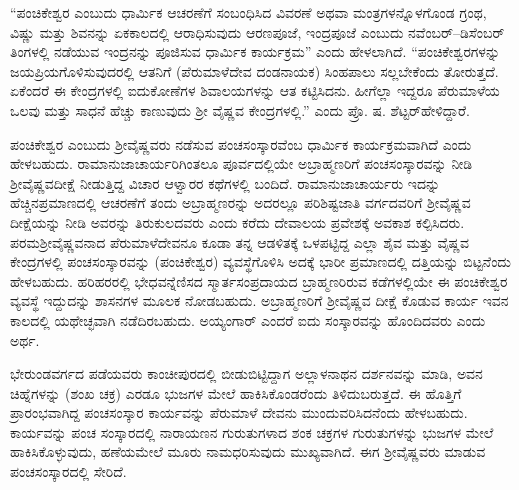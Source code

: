 “ಪಂಚಿಕೇಶ್ವರ ಎಂಬುದು ಧಾರ್ಮಿಕ ಆಚರಣೆಗೆ ಸಂಬಂಧಿಸಿದ ವಿವರಣೆ ಅಥವಾ ಮಂತ್ರಗಳನ್ನೊಳಗೊಂಡ ಗ್ರಂಥ, ವಿಷ್ಣು ಮತ್ತು ಶಿವನನ್ನು ಏಕಕಾಲದಲ್ಲಿ ಆರಾಧಿಸುವುದು ಆರಣಪೂಜೆ, ಇಂದ್ರಪೂಜೆ ಎಂಬುದು ನವೆಂಬರ್​–ಡಿಸೆಂಬರ್​ ತಿಂಗಳಲ್ಲಿ ನಡೆಯುವ ಇಂದ್ರನನ್ನು ಪೂಜಿಸುವ ಧಾರ್ಮಿಕ ಕಾರ್ಯಕ್ರಮ” ಎಂದು ಹೇಳಲಾಗಿದೆ. “ಪಂಚಿಕೇಶ್ವರಗಳನ್ನು ಜಯಪ್ರಿಯಗೊಳಿಸುವುದರಲ್ಲಿ ಆತನಿಗೆ (ಪೆರುಮಾಳೆದೇವ ದಂಡನಾಯಕ) ಸಿಂಹಪಾಲು ಸಲ್ಲಬೇಕೆಂದು ತೋರುತ್ತದೆ. ಏಕೆಂದರೆ ಈ ಕೇಂದ್ರಗಳಲ್ಲಿ ಐದುಕೋಣೆಗಳ ಶಿವಾಲಯಗಳನ್ನು ಆತ ಕಟ್ಟಿಸಿದನು. ಹೀಗೆಲ್ಲಾ ಇದ್ದರೂ ಪೆರುಮಾಳೆಯ ಒಲವು ಮತ್ತು ಸಾಧನೆ ಹೆಚ್ಚು ಕಾಣುವುದು ಶ‍್ರೀ ವೈಷ್ಣವ ಕೇಂದ್ರಗಳಲ್ಲಿ.” ಎಂದು ಪ್ರೊ. ಷ. ಶೆಟ್ಟರ್​ ಹೇಳಿದ್ದಾರೆ.

ಪಂಚಿಕೇಶ್ವರ ಎಂಬುದು ಶ‍್ರೀವೈಷ್ಣವರು ನಡೆಸುವ ಪಂಚಸಂಸ್ಕಾರವೆಂಬ ಧಾರ್ಮಿಕ ಕಾರ್ಯಕ್ರಮವಾಗಿದೆ ಎಂದು ಹೇಳಬಹುದು. ರಾಮಾನುಜಾಚಾರ್ಯರಿಗಿಂತಲೂ ಪೂರ್ವದಲ್ಲಿಯೇ ಅಬ್ರಾಹ್ಮಣರಿಗೆ ಪಂಚಸಂಸ್ಕಾರವನ್ನು ನೀಡಿ ಶ‍್ರೀವೈಷ್ಣವದೀಕ್ಷೆ ನೀಡುತ್ತಿದ್ದ ವಿಚಾರ ಆಳ್ವಾರರ ಕಥೆಗಳಲ್ಲಿ ಬಂದಿದೆ. ರಾಮಾನುಜಾಚಾರ್ಯರು ಇದನ್ನು ಹೆಚ್ಚಿನಪ್ರಮಾಣದಲ್ಲಿ ಆಚರಣೆಗೆ ತಂದು ಅಬ್ರಾಹ್ಮಣರನ್ನು ಅದರಲ್ಲೂ ಪರಿಶಿಷ್ಟಜಾತಿ ವರ್ಗದವರಿಗೆ ಶ‍್ರೀವೈಷ್ಣವ ದೀಕ್ಷೆಯನ್ನು ನೀಡಿ ಅವರನ್ನು ತಿರುಕುಲದವರು ಎಂದು ಕರೆದು ದೇವಾಲಯ ಪ್ರವೇಶಕ್ಕೆ ಅವಕಾಶ ಕಲ್ಪಿಸಿದರು. ಪರಮಶ‍್ರೀವೈಷ್ಣವನಾದ ಪೆರುಮಾಳೆದೇವನೂ ಕೂಡಾ ತನ್ನ ಆಡಳಿತಕ್ಕೆ ಒಳಪಟ್ಟಿದ್ದ ಎಲ್ಲಾ ಶೈವ ಮತ್ತು ವೈಷ್ಣವ ಕೇಂದ್ರಗಳಲ್ಲಿ ಪಂಚಸಂಸ್ಕಾರವನ್ನು (ಪಂಚಿಕೇಶ್ವರ) ವ್ಯವಸ್ಥೆಗೊಳಿಸಿ ಅದಕ್ಕೆ ಭಾರೀ ಪ್ರಮಾಣದಲ್ಲಿ ದತ್ತಿಯನ್ನು ಬಿಟ್ಟನೆಂದು ಹೇಳಬಹುದು. ಹರಿಹರರಲ್ಲಿ ಭೇಧವನ್ನೆಣಿಸದ ಸ್ಮಾರ್ತಸಂಪ್ರದಾಯದ ಬ್ರಾಹ್ಮಣರಿರುವ ಕಡೆಗಳಲ್ಲಿಯೇ ಈ ಪಂಚಿಕೇಶ್ವರ ವ್ಯವಸ್ಥೆ ಇದ್ದುದನ್ನು ಶಾಸನಗಳ ಮೂಲಕ ನೋಡಬಹುದು. ಅಬ್ರಾಹ್ಮಣರಿಗೆ ಶ‍್ರೀವೈಷ್ಣವ ದೀಕ್ಷೆ ಕೊಡುವ ಕಾರ್ಯ ಇವನ ಕಾಲದಲ್ಲಿ ಯಥೇಚ್ಛವಾಗಿ ನಡೆದಿರಬಹುದು. ಅಯ್ಯಂಗಾರ್​ ಎಂದರೆ ಐದು ಸಂಸ್ಕಾರವನ್ನು ಹೊಂದಿದವರು ಎಂದು ಅರ್ಥ.

ಭೇರುಂಡವರ್ಗದ ಪಡೆಯವರು ಕಾಂಚೀಪುರದಲ್ಲಿ ಬೀಡುಬಿಟ್ಟಿದ್ದಾಗ ಅಲ್ಲಾಳನಾಥನ ದರ್ಶನವನ್ನು ಮಾಡಿ, ಅವನ ಚಿಹ್ನೆಗಳನ್ನು (ಶಂಖ ಚಕ್ರ) ಎರಡೂ ಭುಜಗಳ ಮೇಲೆ ಹಾಕಿಸಿಕೊಂಡರೆಂದು ತಿಳಿದುಬರುತ್ತದೆ. ಈ ಹೊತ್ತಿಗೆ ಪ್ರಾರಂಭವಾಗಿದ್ದ ಪಂಚಸಂಸ್ಕಾರ ಕಾರ್ಯವನ್ನು ಪೆರುಮಾಳೆ ದೇವನು ಮುಂದುವರಿಸಿದನೆಂದು ಹೇಳಬಹುದು. ಕಾರ್ಯವನ್ನು ಪಂಚ ಸಂಸ್ಕಾರದಲ್ಲಿ ನಾರಾಯಣನ ಗುರುತುಗಳಾದ ಶಂಕ ಚಕ್ರಗಳ ಗುರುತುಗಳನ್ನು ಭುಜಗಳ ಮೇಲೆ ಹಾಕಿಸಿಕೊಳ್ಳುವುದು, ಹಣೆಯಮೇಲೆ ಮೂರು ನಾಮಧರಿಸುವುದು ಮುಖ್ಯವಾಗಿದೆ. ಈಗ ಶ‍್ರೀವೈಷ್ಣವರು ಮಾಡುವ ಪಂಚಸಂಸ್ಕಾರದಲ್ಲಿ ಸೇರಿದೆ.

